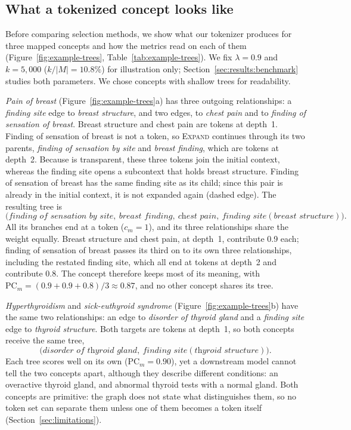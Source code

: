\subsection{What a tokenized concept looks like}
\label{sec:results:examples}

Before comparing selection methods, we show what our tokenizer produces for three mapped concepts and how the metrics read on each of them (Figure~\ref{fig:example-trees}, Table~\ref{tab:example-trees}).
We fix $\lambda = 0.9$ and $k = 5{,}000$ ($k/|M| = 10.8\%$) for illustration only; Section~\ref{sec:results:benchmark} studies both parameters.
We chose concepts with shallow trees for readability.

\textit{Pain of breast} (Figure~\ref{fig:example-trees}a) has three outgoing relationships: a \textit{finding site} edge to \textit{breast structure}, and two \isa{} edges, to \textit{chest pain} and to \textit{finding of sensation of breast}.
Breast structure and chest pain are tokens at depth~1.
Finding of sensation of breast is not a token, so \textsc{Expand} continues through its two parents, \textit{finding of sensation by site} and \textit{breast finding}, which are tokens at depth~2.
Because \isa{} is transparent, these three tokens join the initial context, whereas the finding site opens a subcontext that holds breast structure.
Finding of sensation of breast has the same finding site as its child; since this pair is already in the initial context, it is not expanded again (dashed edge).
The resulting tree is
\[
\big(\textit{finding of sensation by site},\ \textit{breast finding},\ \textit{chest pain},\ \textit{finding site}(\textit{breast structure})\big).
\]
All its branches end at a token ($c_m = 1$), and its three relationships share the weight equally.
Breast structure and chest pain, at depth~1, contribute 0.9 each; finding of sensation of breast passes its third on to its own three relationships, including the restated finding site, which all end at tokens at depth~2 and contribute 0.8.
The concept therefore keeps most of its meaning, with $\mathrm{PC}_m = (0.9 + 0.9 + 0.8)/3 \approx 0.87$, and no other concept shares its tree.

\textit{Hyperthyroidism} and \textit{sick-euthyroid syndrome} (Figure~\ref{fig:example-trees}b) have the same two relationships: an \isa{} edge to \textit{disorder of thyroid gland} and a \textit{finding site} edge to \textit{thyroid structure}.
Both targets are tokens at depth~1, so both concepts receive the same tree,
\[
\big(\textit{disorder of thyroid gland},\ \textit{finding site}(\textit{thyroid structure})\big).
\]
Each tree scores well on its own ($\mathrm{PC}_m = 0.90$), yet a downstream model cannot tell the two concepts apart, although they describe different conditions: an overactive thyroid gland, and abnormal thyroid tests with a normal gland.
Both concepts are primitive: the graph does not state what distinguishes them, so no token set can separate them unless one of them becomes a token itself (Section~\ref{sec:limitations}).

